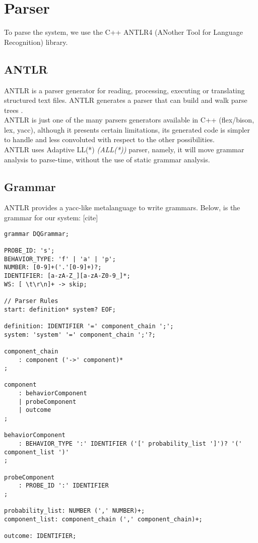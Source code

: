 \section{Parser}
        To parse the system, we use the C++ ANTLR4 (ANother Tool for Language Recognition) library. 
        \subsection{ANTLR}
    ANTLR is a parser generator for reading, processing, executing or translating structured text files. ANTLR generates a parser that can build and walk parse trees \cite{antlr4}. \\
 ANTLR is just one of the many parsers generators available in C++ (flex/bison, lex, yacc), although it presents certain limitations, its generated code is simpler to handle and less convoluted with respect to the other possibilities. \\
        ANTLR uses Adaptive LL(*) \textit{(ALL(*))} parser, namely, it will move grammar analysis to parse-time, without the use of static grammar analysis. \cite{antlr}

        \subsection{Grammar}
            ANTLR provides a yacc-like metalanguage to write grammars. Below, is the grammar for our system: [cite]
            \begin{verbatim} 
grammar DQGrammar;

PROBE_ID: 's';
BEHAVIOR_TYPE: 'f' | 'a' | 'p';
NUMBER: [0-9]+('.'[0-9]+)?;
IDENTIFIER: [a-zA-Z_][a-zA-Z0-9_]*;
WS: [ \t\r\n]+ -> skip;

// Parser Rules
start: definition* system? EOF;

definition: IDENTIFIER '=' component_chain ';';
system: 'system' '=' component_chain ';'?;

component_chain
    : component ('->' component)*
;

component
    : behaviorComponent
    | probeComponent
    | outcome
;

behaviorComponent
    : BEHAVIOR_TYPE ':' IDENTIFIER ('[' probability_list ']')? '(' component_list ')'
;

probeComponent
    : PROBE_ID ':' IDENTIFIER
;

probability_list: NUMBER (',' NUMBER)+;
component_list: component_chain (',' component_chain)+;

outcome: IDENTIFIER;
        \end{verbatim}
             

